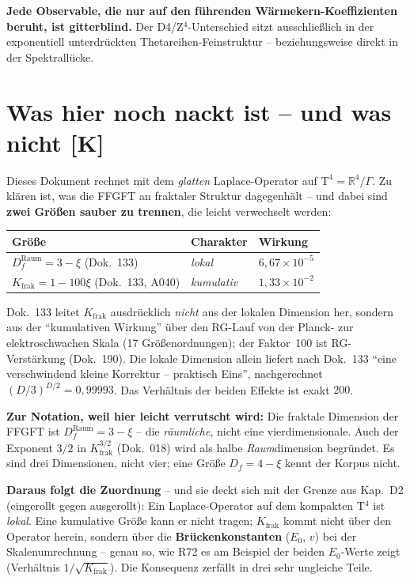 \documentclass[11pt]{report}
\begin{document}
\textbf{Jede Observable, die nur auf den führenden
Wärmekern-Koeffizienten beruht, ist gitterblind.} Der
D4/Z$^4$-Unterschied sitzt ausschließlich in der exponentiell
unterdrückten Thetareihen-Feinstruktur -- beziehungsweise direkt in
der Spektrallücke.

\chapter{Was hier noch nackt ist -- und was nicht [K]}

Dieses Dokument rechnet mit dem \emph{glatten} Laplace-Operator auf
$\text{T}^4 = \mathbb{R}^4/\Gamma$. Zu klären ist, was die FFGFT
an fraktaler Struktur dagegenhält -- und dabei sind \textbf{zwei
Größen sauber zu trennen}, die leicht verwechselt werden:

\begin{center}
\begin{tabular}{lll}
\toprule
Größe & Charakter & Wirkung \\
\midrule
$D_f^\text{Raum} = 3-\xi$ (Dok.~133) & \emph{lokal} &
  $6{,}67\times10^{-5}$ \\
$K_\text{frak} = 1-100\xi$ (Dok.~133, A040) & \emph{kumulativ} &
  $1{,}33\times10^{-2}$ \\
\bottomrule
\end{tabular}
\end{center}

\noindent Dok.~133 leitet $K_\text{frak}$ ausdrücklich \emph{nicht}
aus der lokalen Dimension her, sondern aus der \enquote{kumulativen
Wirkung} über den RG-Lauf von der Planck- zur elektroschwachen
Skala (17 Größenordnungen); der Faktor~100 ist RG-Verstärkung
(Dok.~190). Die lokale Dimension allein liefert nach Dok.~133
\enquote{eine verschwindend kleine Korrektur -- praktisch Eins},
nachgerechnet $(D/3)^{D/2} = 0{,}99993$. Das Verhältnis der beiden
Effekte ist exakt $200$.

\textbf{Zur Notation, weil hier leicht verrutscht wird:} Die
fraktale Dimension der FFGFT ist $D_f^\text{Raum} = 3-\xi$ -- die
\emph{räumliche}, nicht eine vierdimensionale. Auch der Exponent
$3/2$ in $K_\text{frak}^{3/2}$ (Dok.~018) wird als halbe
\emph{Raum}dimension begründet. Es sind drei Dimensionen, nicht
vier; eine Größe $D_f = 4-\xi$ kennt der Korpus nicht.

\textbf{Daraus folgt die Zuordnung} -- und sie deckt sich mit der
Grenze aus Kap.~D2 (eingerollt gegen ausgerollt): Ein
Laplace-Operator auf dem kompakten T$^4$ ist \emph{lokal}. Eine
kumulative Größe kann er nicht tragen; $K_\text{frak}$ kommt nicht
über den Operator herein, sondern über die \textbf{Brücken\-kon\-stan\-ten}
($E_0$, $v$) bei der Skalenumrechnung -- genau so, wie R72 es am
Beispiel der beiden $E_0$-Werte zeigt (Verhältnis $1/\sqrt{K_\text{frak}}$).
Die Konsequenz zerfällt in drei sehr ungleiche Teile.
\end{document}

